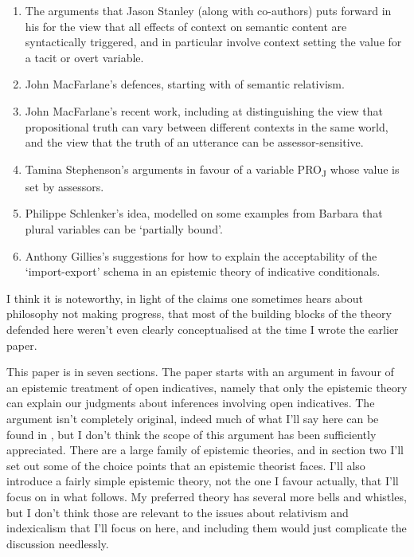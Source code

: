 \medskip
\renewcommand{\labelenumi}{\arabic{enumi}.}
\begin{enumerate}
\item The arguments that Jason Stanley (along with co-authors) puts forward in his \citeyearpar{Stanley2007-STALIC} for the view that all effects of context on semantic content are syntactically triggered, and in particular involve context setting the value for a tacit or overt variable. 
\item John MacFarlane's defences, starting with \citet{MacFarlane2003-MACFCA-2} of semantic relativism.
\item John MacFarlane's recent work, including \citet{MacFarlane2009-MACNC} at distinguishing the view that propositional truth can vary between different contexts in the same world, and the view that the truth of an utterance can be assessor-sensitive.
\item Tamina Stephenson's \citeyearpar{Stephenson2007} arguments in favour of a variable PRO\textsubscript{J} whose value is set by assessors.
\item Philippe Schlenker's \citeyearpar{Schlenker2003} idea, modelled on some examples from Barbara  \citet{Partee1989} that plural variables can be `partially bound'.
\item Anthony Gillies's \citeyearpar{Gillies2009-GILOTF} suggestions for how to explain the acceptability of the `import\nobreakdash-export' schema in an epistemic theory of indicative conditionals.
\end{enumerate}

\noindent I think it is noteworthy, in light of the claims one sometimes hears about philosophy not making progress, that most of the building blocks of the theory defended here weren't even clearly conceptualised at the time I wrote the earlier paper.

This paper is in seven sections. The paper starts with an argument in favour of an epistemic treatment of open indicatives, namely that only the epistemic theory can explain our judgments about inferences involving open indicatives. The argument isn't completely original, indeed much of what I'll say here can be found in \citet{Stalnaker1975-STAIC}, but I don't think the scope of this argument has been sufficiently appreciated. There are a large family of epistemic theories, and in section two I'll set out some of the choice points that an epistemic theorist faces. I'll also introduce a fairly simple epistemic theory, not the one I favour actually, that I'll focus on in what follows. My preferred theory has several more bells and whistles, but I don't think those are relevant to the issues about relativism and indexicalism that I'll focus on here, and including them would just complicate the discussion needlessly.

